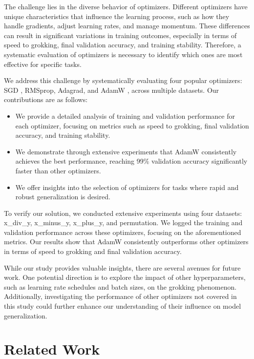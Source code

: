 \documentclass{article} %
\begin{document}
The challenge lies in the diverse behavior of optimizers. Different optimizers have unique characteristics that influence the learning process, such as how they handle gradients, adjust learning rates, and manage momentum. These differences can result in significant variations in training outcomes, especially in terms of speed to grokking, final validation accuracy, and training stability. Therefore, a systematic evaluation of optimizers is necessary to identify which ones are most effective for specific tasks.

We address this challenge by systematically evaluating four popular optimizers: SGD \cite{goodfellow2016deep}, RMSprop, Adagrad, and AdamW \cite{loshchilov2017adamw}, across multiple datasets. Our contributions are as follows:
\begin{itemize}
    \item We provide a detailed analysis of training and validation performance for each optimizer, focusing on metrics such as speed to grokking, final validation accuracy, and training stability.
    \item We demonstrate through extensive experiments that AdamW consistently achieves the best performance, reaching 99\% validation accuracy significantly faster than other optimizers.
    \item We offer insights into the selection of optimizers for tasks where rapid and robust generalization is desired.
\end{itemize}

To verify our solution, we conducted extensive experiments using four datasets: x\_div\_y, x\_minus\_y, x\_plus\_y, and permutation. We logged the training and validation performance across these optimizers, focusing on the aforementioned metrics. Our results show that AdamW consistently outperforms other optimizers in terms of speed to grokking and final validation accuracy.

While our study provides valuable insights, there are several avenues for future work. One potential direction is to explore the impact of other hyperparameters, such as learning rate schedules and batch sizes, on the grokking phenomenon. Additionally, investigating the performance of other optimizers not covered in this study could further enhance our understanding of their influence on model generalization.

\section{Related Work}
\label{sec:related}
\end{document}
